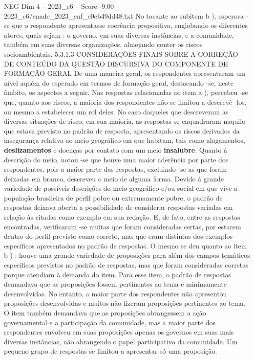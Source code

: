 \begin{textsample}{NEG Dim 4 – 2023\_c6 – Score -9.00 – 2023\_c6/enade\_2023\_enf\_e0eb49dd48.txt}
No tocante ao subitem b ), esperava -se que o respondente apresentasse coerência propositiva, englobando os diferentes atores, quais sejam : o governo, em suas diversas instâncias, e a comunidade, também em suas diversas organizações, almejando conter os riscos socioambientais. 5.3.1.3 CONSIDERAÇÕES FINAIS SOBRE A CORREÇÃO DE CONTEÚDO DA QUESTÃO DISCURSIVA DO COMPONENTE DE FORMAÇÃO GERAL De uma maneira geral, os respondentes apresentaram um nível aquém do esperado em termos de formação geral, destacando -se, neste âmbito, os aspectos a seguir.
Nas respostas relacionadas ao item a ), percebeu -se que, quanto aos riscos, a maioria dos respondentes não se limitou a descrevê -los, ou mesmo a estabelecer um rol deles.
No caso daqueles que descreveram as diversas situações de risco, em sua maioria, as respostas se enquadraram naquilo que estava previsto no padrão de resposta, apresentando os riscos derivados da insegurança relativa ao meio geográfico em que habitam, tais como alagamentos, \textbf{deslizamentos} e doenças por contato com um meio \textbf{insalubre}.
Quanto à descrição do meio, notou -se que houve uma maior aderência por parte dos respondentes, pois a maior parte das respostas, excluindo -se as que foram deixadas em branco, descreveu o meio de alguma forma.
Devido à grande variedade de possíveis descrições do meio geográfico e/ou social em que vive a população brasileira de perfil pobre ou extremamente pobre, o padrão de respostas deixava aberta a possibilidade de considerar respostas variadas em relação às citadas como exemplo em sua redação.
E, de fato, entre as respostas encontradas, verificaram -se muitas que foram consideradas certas, por estarem dentro do perfil previsto como correto, mas que eram distintas dos exemplos específicos apresentados no padrão de respostas.
O mesmo se deu quanto ao item b ) : houve uma grande variedade de proposições para além dos campos temáticos específicos previstos no padrão de respostas, mas que foram consideradas corretas porque atendiam à demanda do item.
Para esse item, o padrão de respostas demandava que as proposições fossem pertinentes ao tema e minimamente desenvolvidas.
No entanto, a maior parte dos respondentes não apresentou proposições desenvolvidas e muitos não fizeram proposições pertinentes ao tema.
O item também demandava que as proposições abrangessem a ação governamental e a participação da comunidade, mas a maior parte dos respondentes envolveu em suas proposições apenas os governos em suas mais diversas instâncias, não abrangendo o papel participativo da comunidade.
Um pequeno grupo de respostas se limitou a apresentar só uma proposição.

\end{textsample}
